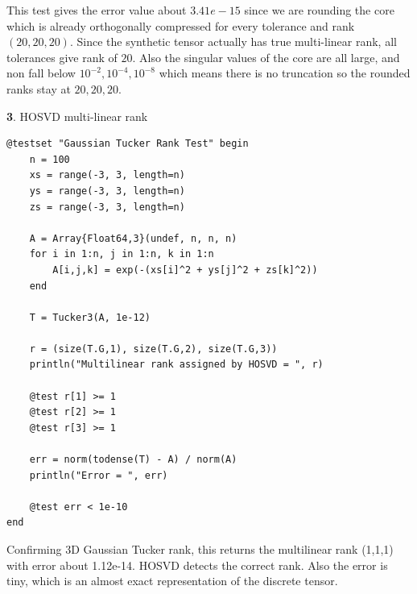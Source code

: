 \documentclass[11pt]{article}
\begin{document}
This test gives the error value about $3.41e-15$ since we are rounding the core which is already orthogonally compressed for every tolerance and rank $(20,20,20)$. Since the synthetic tensor actually has true multi-linear rank, all tolerances give rank of $20$. Also the singular values of the core are all large, and non fall below $10^{-2}, 10^{-4}, 10^{-8}$ which means there is no truncation so the rounded ranks stay at $20,20,20$. 

\vspace{1.5em}

\textbf{3}. HOSVD multi-linear rank

\begin{lstlisting}
@testset "Gaussian Tucker Rank Test" begin
    n = 100
    xs = range(-3, 3, length=n)
    ys = range(-3, 3, length=n)
    zs = range(-3, 3, length=n)

    A = Array{Float64,3}(undef, n, n, n)
    for i in 1:n, j in 1:n, k in 1:n
        A[i,j,k] = exp(-(xs[i]^2 + ys[j]^2 + zs[k]^2))
    end

    T = Tucker3(A, 1e-12)

    r = (size(T.G,1), size(T.G,2), size(T.G,3))
    println("Multilinear rank assigned by HOSVD = ", r)

    @test r[1] >= 1
    @test r[2] >= 1
    @test r[3] >= 1

    err = norm(todense(T) - A) / norm(A)
    println("Error = ", err)

    @test err < 1e-10
end
\end{lstlisting}

Confirming 3D Gaussian Tucker rank, this returns the multilinear rank (1,1,1) with error about 1.12e-14. HOSVD detects the correct rank. Also the error is tiny, which is an almost exact representation of the discrete tensor.
\end{document}
